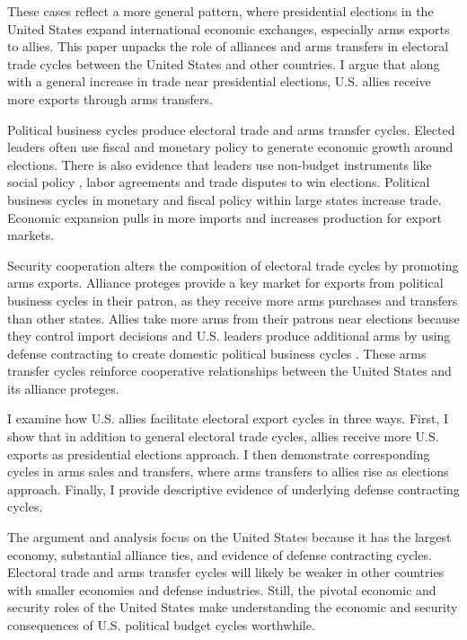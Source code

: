 \documentclass[12pt]{article}
\begin{document}
These cases reflect a more general pattern, where presidential elections in the United States expand international economic exchanges, especially arms exports to allies.
This paper unpacks the role of alliances and arms transfers in electoral trade cycles between the United States and other countries. 
I argue that along with a general increase in trade near presidential elections, U.S. allies receive more exports through arms transfers.


Political business cycles produce electoral trade and arms transfer cycles.
Elected leaders often use fiscal and monetary policy \citep{Nordhaus1975, Tufte1978, Rogoff1987, ClarkHallerberg2000} to generate economic growth around elections. 
There is also evidence that leaders use non-budget instruments like social policy \citep{Philips2020}, labor agreements \citep{Ahlquist2010} and trade disputes \citep{Conconietal2017} to win elections. 
Political business cycles in monetary and fiscal policy within large states increase trade. 
Economic expansion pulls in more imports and increases production for export markets. 


Security cooperation alters the composition of electoral trade cycles by promoting arms exports. 
Alliance proteges provide a key market for exports from political business cycles in their patron, as they receive more arms purchases and transfers than other states. 
Allies take more arms from their patrons near elections because they control import decisions and U.S. leaders produce additional arms by using defense contracting to create domestic political business cycles \citep{Tufte1978, Mintz1988, Mayer1995, DerouenHeo2000, Becker2021}.
These arms transfer cycles reinforce cooperative relationships between the United States and its alliance proteges.


I examine how U.S. allies facilitate electoral export cycles in three ways. 
First, I show that in addition to general electoral trade cycles, allies receive more U.S. exports as presidential elections approach.
I then demonstrate corresponding cycles in arms sales and transfers, where arms transfers to allies rise as elections approach.  
Finally, I provide descriptive evidence of underlying defense contracting cycles.


The argument and analysis focus on the United States because it has the largest economy, substantial alliance ties, and evidence of defense contracting cycles. 
Electoral trade and arms transfer cycles will likely be weaker in other countries with smaller economies and defense industries. 
Still, the pivotal economic and security roles of the United States make understanding the economic and security consequences of U.S. political budget cycles worthwhile.
\end{document}
